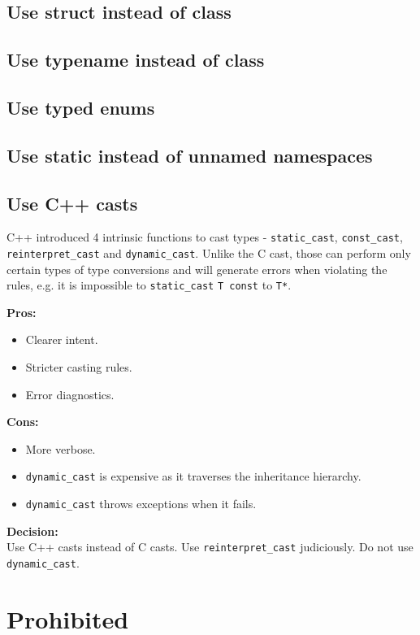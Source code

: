 \documentclass[12pt, a4paper]{article}
\newenvironment{itemlist}
{
\vspace{-0.5\topsep}
\begin{itemize}
  \setlength{\itemsep}{4pt}
  \setlength{\parskip}{0pt}
} {
\end{itemize}
\vspace{-0.5\topsep}
}
\newcommand{\code}[1]{\texttt{#1}}
\begin{document}
\subsection{Use struct instead of class}
\subsection{Use typename instead of class}
\subsection{Use typed enums}
\subsection{Use static instead of unnamed namespaces}
\subsection{Use C++ casts}
C++ introduced 4 intrinsic functions to cast types - \code{static\_cast},
\code{const\_cast}, \code{reinterpret\_cast} and \code{dynamic\_cast}. Unlike
the C cast, those can perform only certain types of type conversions and will
generate errors when violating the rules, e.g. it is impossible to
\code{static\_cast} \code{T const\*} to \code{T*}.

\noindent\textbf{Pros:}
\begin{itemlist}
  \item Clearer intent.
  \item Stricter casting rules.
  \item Error diagnostics.
\end{itemlist}

\noindent\textbf{Cons:}
\begin{itemlist}
  \item More verbose.
  \item \code{dynamic\_cast} is expensive as it traverses the inheritance
  hierarchy.
  \item \code{dynamic\_cast} throws exceptions when it fails.
\end{itemlist}

\noindent\textbf{Decision:} \\
Use C++ casts instead of C casts. Use \code{reinterpret\_cast} judiciously. Do
not use \code{dynamic\_cast}.

\section{Prohibited}
\end{document}
